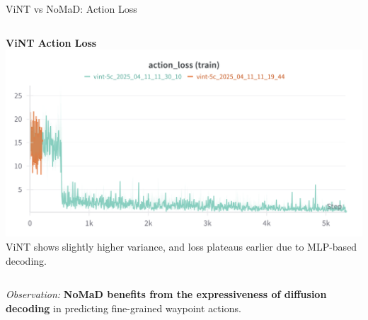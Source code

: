 \documentclass{beamer}
\begin{document}
\begin{frame}{ViNT vs NoMaD: Action Loss}
\begin{columns}
        \begin{column}{0.48\textwidth}
            \begin{block}{\centering \small \textbf{ViNT Action Loss}}
                \centering
                \includegraphics[width=\textwidth]{images/action_train_vint.png}
                \tiny ViNT shows slightly higher variance, and loss plateaus earlier due to MLP-based decoding.
            \end{block}
        \end{column}
    \end{columns}

    \vspace{0.5em}
    \centering
    \textit{Observation:} \textbf{NoMaD benefits from the expressiveness of diffusion decoding} in predicting fine-grained waypoint actions.
\end{frame}


\end{document}
